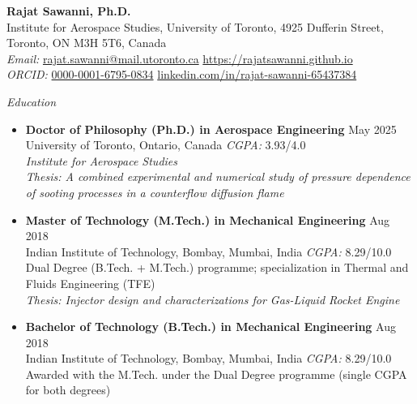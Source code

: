 \documentclass[11pt,a4paper]{article}
\begin{document}
	
	\begin{maintitlebanner}
		{\selectfont\bfseries\LARGE Rajat Sawanni, Ph.D.} \\[4pt]
		{\normalsize \mdseries Institute for Aerospace Studies, University of Toronto, 4925 Dufferin Street, Toronto, ON M3H 5T6, Canada \\
		{\it Email:} \href{mailto:rajat.sawanni@mail.utoronto.ca}{rajat.sawanni@mail.utoronto.ca} \quad {} \href{https://rajatsawanni.github.io}{https://rajatsawanni.github.io} \\
		{\it ORCID:} \href{https://orcid.org/0000-0001-6795-0834}{0000-0001-6795-0834} \quad {} \href{https://www.linkedin.com/in/rajat-sawanni-65437384/}{linkedin.com/in/rajat-sawanni-65437384}}
	\end{maintitlebanner}
	
	\begin{sectionbanner}{\emph{Education}}
	\end{sectionbanner}
	
	\begin{itemize}
		\item \textbf{Doctor of Philosophy (Ph.D.) in Aerospace Engineering} \hfill May 2025 \\
		University of Toronto, Ontario, Canada \hfill \emph{CGPA:} 3.93/4.0 \\
		{\em Institute for Aerospace Studies} \\
		\emph{Thesis: A combined experimental and numerical study of pressure dependence of sooting processes in a counterflow diffusion flame}
		
		\item \textbf{Master of Technology (M.Tech.) in Mechanical Engineering} \hfill Aug 2018 \\
		Indian Institute of Technology, Bombay, Mumbai, India \hfill \emph{CGPA:} 8.29/10.0 \\
		Dual Degree (B.Tech. + M.Tech.) programme; specialization in Thermal and Fluids Engineering (TFE) \\
		\emph{Thesis: Injector design and characterizations for Gas-Liquid Rocket Engine}
		
		\item \textbf{Bachelor of Technology (B.Tech.) in Mechanical Engineering} \hfill Aug 2018 \\
		Indian Institute of Technology, Bombay, Mumbai, India \hfill \emph{CGPA:} 8.29/10.0 \\
		Awarded with the M.Tech. under the Dual Degree programme (single CGPA for both degrees)
		
	\end{itemize}
	
\end{document}
